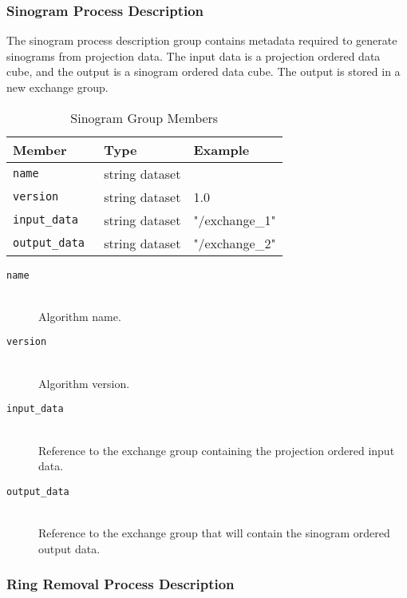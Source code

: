 \subsubsection{Sinogram Process Description}
\label{table:sinogram}

The sinogram process description group contains metadata required to generate sinograms from projection data. The input data is a projection ordered data cube, and the output is a sinogram ordered data cube. The output is stored in a new exchange group.

\begin{table}[h!]\sffamily \footnotesize
\caption{Sinogram Group Members}
\centering
{}
\begin{tabular}{l l l}

\toprule
\bfseries Member     & \bfseries Type & \bfseries Example \\
\midrule
\tt{name} & string dataset &  \\  
\tt{version}  & string dataset  & 1.0 \\
\tt{input\_data} &  string dataset & "/exchange\_1" \\
\tt{output\_data} & string dataset & "/exchange\_2" \\
\bottomrule
\end{tabular}
\end{table}

\begin{description}
\item[\tt{name}] \hfill \\
{Algorithm name.}

\item[\tt{version}] \hfill \\
{Algorithm version.}

\item[\tt{input\_data}] \hfill \\
{Reference to the exchange group containing the projection ordered input data.}

\item[\tt{output\_data}] \hfill \\
{Reference to the exchange group that will contain the sinogram ordered output data.}

\end{description}

\subsubsection{Ring Removal Process Description}

